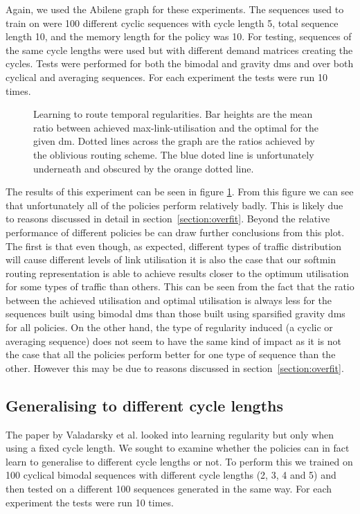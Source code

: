 Again, we used the Abilene graph for these experiments. The sequences used to train on were 100 different cyclic sequences with cycle length 5, total sequence length 10, and the memory length for the policy was 10. For testing, sequences of the same cycle lengths were used but with different demand matrices creating the cycles. Tests were performed for both the bimodal and gravity \acp{dm} and over both cyclical and averaging sequences. For each experiment the tests were run 10 times.

\begin{figure}
    \centering
    
    \caption{Learning to route temporal regularities. Bar heights are the mean ratio between achieved max-link-utilisation and the optimal for the given \ac{dm}. Dotted lines across the graph are the ratios achieved by the oblivious routing scheme. The blue doted line is unfortunately underneath and obscured by the orange dotted line.}
    \label{fig:exp_cyclic}
\end{figure}

The results of this experiment can be seen in figure \ref{fig:exp_cyclic}. From this figure we can see that unfortunately all of the policies perform relatively badly. This is likely due to reasons discussed in detail in section~\ref{section:overfit}. Beyond the relative performance of different policies be can draw further conclusions from this plot. The first is that even though, as expected, different types of traffic distribution will cause different levels of link utilisation it is also the case that our softmin routing representation is able to achieve results closer to the optimum utilisation for some types of traffic than others. This can be seen from the fact that the ratio between the achieved utilisation and optimal utilisation is always less for the sequences built using bimodal \acp{dm} than those built using sparsified gravity \acp{dm} for all policies. On the other hand, the type of regularity induced (a cyclic or averaging sequence) does not seem to have the same kind of impact as it is not the case that all the policies perform better for one type of sequence than the other. However this may be due to reasons discussed in section~\ref{section:overfit}.

\subsection{Generalising to different cycle lengths}
The paper by Valadarsky et al. looked into learning regularity but only when using a fixed cycle length. We sought to examine whether the policies can in fact learn to generalise to different cycle lengths or not. To perform this we trained on 100 cyclical bimodal sequences with different cycle lengths (2, 3, 4 and 5) and then tested on a different 100 sequences generated in the same way. For each experiment the tests were run 10 times.

